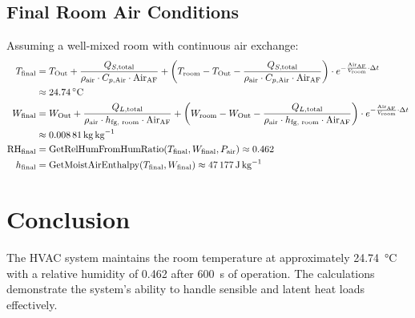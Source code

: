 \documentclass[12pt]{article}
\begin{document}
\subsection{Final Room Air Conditions}
Assuming a well-mixed room with continuous air exchange:
\begin{align}
    T_{\text{final}} &= T_{\text{Out}} + \frac{Q_{S,\text{total}}}{\rho_{\text{air}} \cdot C_{p,\text{Air}} \cdot \text{Air}_{\text{AF}}} + \left( T_{\text{room}} - T_{\text{Out}} - \frac{Q_{S,\text{total}}}{\rho_{\text{air}} \cdot C_{p,\text{Air}} \cdot \text{Air}_{\text{AF}}} \right) \cdot e^{-\frac{\text{Air}_{\text{AF}}}{V_{\text{room}}} \cdot \Delta t} \notag \\
    &\approx \SI{24.74}{\celsius} \\
    W_{\text{final}} &= W_{\text{Out}} + \frac{Q_{L,\text{total}}}{\rho_{\text{air}} \cdot h_{\text{fg, room}} \cdot \text{Air}_{\text{AF}}} + \left( W_{\text{room}} - W_{\text{Out}} - \frac{Q_{L,\text{total}}}{\rho_{\text{air}} \cdot h_{\text{fg, room}} \cdot \text{Air}_{\text{AF}}} \right) \cdot e^{-\frac{\text{Air}_{\text{AF}}}{V_{\text{room}}} \cdot \Delta t} \notag \\
    &\approx \SI{0.00881}{\kilo\gram\per\kilo\gram} \\
    \text{RH}_{\text{final}} &= \text{GetRelHumFromHumRatio}(T_{\text{final}}, W_{\text{final}}, P_{\text{air}}) \approx 0.462 \\
    h_{\text{final}} &= \text{GetMoistAirEnthalpy}(T_{\text{final}}, W_{\text{final}}) \approx \SI{47177}{\joule\per\kilo\gram}
\end{align}

\section{Conclusion}
The HVAC system maintains the room temperature at approximately \SI{24.74}{\celsius} with a relative humidity of 0.462 after \SI{600}{\second} of operation. The calculations demonstrate the system's ability to handle sensible and latent heat loads effectively.
\end{document}
